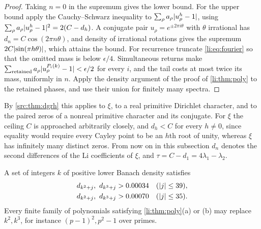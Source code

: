 \begin{proof}
Taking $n=0$ in the supremum gives the lower bound. For the upper bound apply the
Cauchy--Schwarz inequality to $\sum_\rho a_\rho\lvert u_\rho^h-1\rvert$, using
$\sum_\rho a_\rho\lvert u_\rho^h-1\rvert^2=2(C-d_h)$. A conjugate pair $u_\rho=e^{\pm2\pi i\theta}$ with
$\theta$ irrational has $d_n=C\cos(2\pi n\theta)$, and density of irrational rotations gives the
supremum $2C\lvert\sin(\pi h\theta)\rvert$, which attains the bound. For recurrence truncate
\eqref{li:eq:fourier} so that the omitted mass is below $\epsilon/4$. Simultaneous returns make
$\sum_{\mathrm{retained}}a_\rho\lvert u_\rho^{P_i(k)}-1\rvert<\epsilon/2$ for every $i$, and the tail costs
at most twice its mass, uniformly in $n$. Apply the density argument of the proof of
\cref{li:thm:poly} to the retained phases, and use their union for finitely many spectra.
\end{proof}

By \cref{src:thm:dgrh} this applies to $\xi$, to a real primitive Dirichlet character, and to the
paired zeros of a nonreal primitive character and its conjugate. For $\xi$ the ceiling $C$ is
approached arbitrarily closely, and $d_h<C$ for every $h\ne0$, since equality would require every
Cayley point to be an $h$th root of unity, whereas $\xi$ has infinitely many distinct zeros.
From now on in this subsection $d_n$ denotes the second differences of the Li coefficients of
$\xi$, and $\tau=C-d_1=4\lambda_1-\lambda_2$.

\begin{proposition}\label{li:prop:windows}
A set of integers $k$ of positive lower Banach density satisfies
\begin{align}
 d_{k^2+j},\ d_{k^3+j}&>0.00034&&(\lvert j\rvert\le39),\label{li:eq:79window}\\
 d_{k^2+j},\ d_{k^3+j}&>0.00070&&(\lvert j\rvert\le35).\label{li:eq:71window}
\end{align}
Every finite family of polynomials satisfying \cref{li:thm:poly}\textup{(a)} or \textup{(b)} may
replace $k^2,k^3$, for instance $(p-1)^2,p^2-1$ over primes.
\end{proposition}

